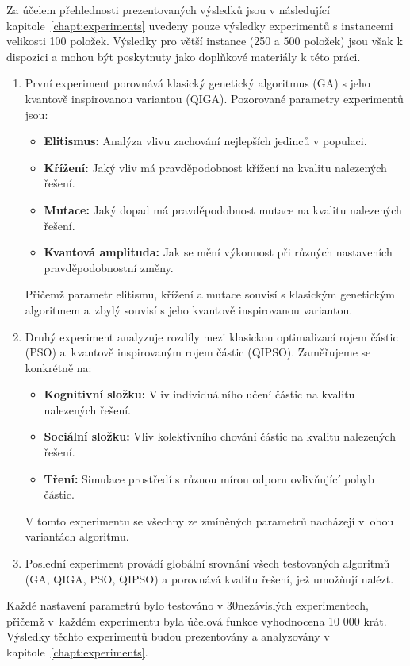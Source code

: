 Za účelem přehlednosti prezentovaných výsledků jsou v následující kapitole~\ref{chapt:experiments} uvedeny pouze výsledky experimentů s instancemi velikosti 100 položek. 
Výsledky pro větší instance (250 a 500 položek) jsou však k dispozici a mohou být poskytnuty jako doplňkové materiály k této práci.

\begin{enumerate}    
    \item První experiment porovnává klasický genetický algoritmus (GA) s jeho kvantově inspirovanou variantou (QIGA). 
        Pozorované parametry experimentů jsou:
        \begin{itemize}
            \item \textbf{Elitismus:} Analýza vlivu zachování nejlepších jedinců v populaci.
            \item \textbf{Křížení:} Jaký vliv má pravděpodobnost křížení na kvalitu nalezených řešení.
            \item \textbf{Mutace:} Jaký dopad má pravděpodobnost mutace na kvalitu nalezených řešení.
            \item \textbf{Kvantová amplituda:} Jak se mění výkonnost při různých nastaveních pravděpodobnostní změny.
        \end{itemize}
        Přičemž parametr elitismu, křížení a mutace souvisí s klasickým genetickým algoritmem a~zbylý souvisí s jeho kvantově inspirovanou variantou. 
    \item Druhý experiment analyzuje rozdíly mezi klasickou optimalizací rojem částic (PSO) a~kvantově inspirovaným rojem částic (QIPSO). 
        Zaměřujeme se konkrétně na:
        \begin{itemize}
            \item \textbf{Kognitivní složku:} Vliv individuálního učení částic na kvalitu nalezených řešení.
            \item \textbf{Sociální složku:} Vliv kolektivního chování částic na kvalitu nalezených řešení.
            \item \textbf{Tření:} Simulace prostředí s různou mírou odporu ovlivňující pohyb částic.
        \end{itemize}
        V tomto experimentu se všechny ze zmíněných parametrů nacházejí v~obou variantách algoritmu.
    \item Poslední experiment provádí globální srovnání všech testovaných algoritmů (GA, QIGA, PSO, QIPSO) a porovnává kvalitu řešení, jež umožňují nalézt.
\end{enumerate}

Každé nastavení parametrů bylo testováno v 30nezávislých experimentech, přičemž v~každém experimentu byla účelová funkce vyhodnocena 10 000 krát. 
Výsledky těchto experimentů budou prezentovány a analyzovány v kapitole~\ref{chapt:experiments}. 
